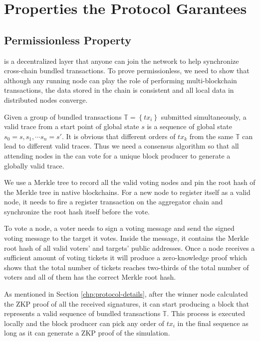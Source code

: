 \section {Properties the Protocol Garantees}
\label{chp:properities}

\subsection{Permissionless Property}
\dprotocol is a decentralized layer that anyone can join the network to help synchronize cross-chain bundled transactions. To prove permissionless, we need to show that although any running node can play the role of performing multi-blockchain transactions, the data stored in the chain is consistent and all local data in distributed nodes converge.

Given a group of bundled transactions $\mathbb{T} = \left\{tx_i\right\}$ submitted simultaneously, a valid trace from a start point of global state $s$ is a sequence of global state $s_0=s, s_1, \cdots s_n = s'$. It is obvious that different orders of $tx_k$ from the same $\mathbb{T}$ can lead to different valid traces. Thus we need a consensus algorithm so that all attending nodes in the \dprotocol can vote for a unique block producer to generate a globally valid trace.

We use a Merkle tree to record all the valid voting nodes and pin the root hash of the Merkle tree in native blockchains. For a new node to register itself as a valid node, it needs to fire a register transaction on the aggregator chain and synchronize the root hash itself before the vote.

To vote a node, a voter needs to sign a voting message and send the signed voting message to the target it votes. Inside the message, it contains the Merkle root hash of all valid voters' and targets' public addresses. Once a node receives a sufficient amount of voting tickets it will produce a zero-knowledge proof which shows that the total number of tickets reaches two-thirds of the total number of voters and all of them has the correct Merkle root hash. 

As mentioned in Section \ref{chp:protocol-details}, after the winner node calculated the ZKP proof of all the received signatures, it can start producing a block that represents a valid sequence of bundled transactions $\mathbb{T}$. This process is executed locally and the block producer can pick any order of $tx_i$ in the final sequence as long as it can generate a ZKP proof of the simulation.

